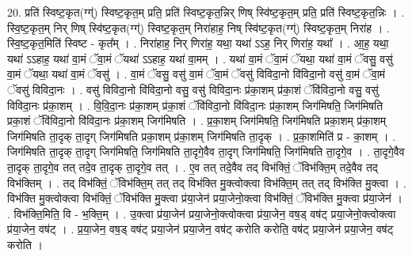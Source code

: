 \documentclass[17pt]{extarticle}
\begin{document}
20. प्रति॑ स्विष्ट॒कृत(ग्ग्॑) स्विष्ट॒कृत॒म् प्रति॒ प्रति॑ स्विष्ट॒कृत॒न्निर् णिष् स्वि॑ष्ट॒कृत॒म् प्रति॒ प्रति॑ स्विष्ट॒कृत॒न्निः । . स्वि॒ष्ट॒कृत॒म् निर् णिष् स्वि॑ष्ट॒कृत(ग्ग्॑) स्विष्ट॒कृत॒म् निरा॑हाह॒ निष् स्वि॑ष्ट॒कृत(ग्ग्॑) स्विष्ट॒कृत॒म् निरा॑ह । . स्वि॒ष्ट॒कृत॒मिति॑ स्विष्ट - कृत᳚म् । . निरा॑हाह॒ निर् णिरा॑ह॒ यथा॒ यथा॑ ऽऽह॒ निर् णिरा॑ह॒ यथा᳚ । . आ॒ह॒ यथा॒ यथा॑ ऽऽहाह॒ यथा॑ वा॒मं ॅवा॒मं ॅयथा॑ ऽऽहाह॒ यथा॑ वा॒मम् । . यथा॑ वा॒मं ॅवा॒मं ॅयथा॒ यथा॑ वा॒मं ॅवसु॒ वसु॑ वा॒मं ॅयथा॒ यथा॑ वा॒मं ॅवसु॑ । . वा॒मं ॅवसु॒ वसु॑ वा॒मं ॅवा॒मं ॅवसु॑ विविदा॒नो वि॑विदा॒नो वसु॑ वा॒मं ॅवा॒मं ॅवसु॑ विविदा॒नः । . वसु॑ विविदा॒नो वि॑विदा॒नो वसु॒ वसु॑ विविदा॒नः प्र॑का॒शम् प्र॑का॒शं ॅवि॑विदा॒नो वसु॒ वसु॑ विविदा॒नः प्र॑का॒शम् । . वि॒वि॒दा॒नः प्र॑का॒शम् प्र॑का॒शं ॅवि॑विदा॒नो वि॑विदा॒नः प्र॑का॒शम् जिग॑मिषति॒ जिग॑मिषति प्रका॒शं ॅवि॑विदा॒नो वि॑विदा॒नः प्र॑का॒शम् जिग॑मिषति । . प्र॒का॒शम् जिग॑मिषति॒ जिग॑मिषति प्रका॒शम् प्र॑का॒शम् जिग॑मिषति ता॒दृक् ता॒दृग् जिग॑मिषति प्रका॒शम् प्र॑का॒शम् जिग॑मिषति ता॒दृक् । . प्र॒का॒शमिति॑ प्र - का॒शम् । . जिग॑मिषति ता॒दृक् ता॒दृग् जिग॑मिषति॒ जिग॑मिषति ता॒दृगे॒वैव ता॒दृग् जिग॑मिषति॒ जिग॑मिषति ता॒दृगे॒व । . ता॒दृगे॒वैव ता॒दृक् ता॒दृगे॒व तत् तदे॒व ता॒दृक् ता॒दृगे॒व तत् । . ए॒व तत् तदे॒वैव तद् विभ॑क्तिं॒ ॅविभ॑क्ति॒म् तदे॒वैव तद् विभ॑क्तिम् । . तद् विभ॑क्तिं॒ ॅविभ॑क्ति॒म् तत् तद् विभ॑क्ति मु॒क्त्वोक्त्वा विभ॑क्ति॒म् तत् तद् विभ॑क्ति मु॒क्त्वा । . विभ॑क्ति मु॒क्त्वोक्त्वा विभ॑क्तिं॒ ॅविभ॑क्ति मु॒क्त्वा प्र॑या॒जेन॑ प्रया॒जेनो॒क्त्वा विभ॑क्तिं॒ ॅविभ॑क्ति मु॒क्त्वा प्र॑या॒जेन॑ । . विभ॑क्ति॒मिति॒ वि - भ॒क्ति॒म् । . उ॒क्त्वा प्र॑या॒जेन॑ प्रया॒जेनो॒क्त्वोक्त्वा प्र॑या॒जेन॒ वष॒ड् वष॑ट् प्रया॒जेनो॒क्त्वोक्त्वा प्र॑या॒जेन॒ वष॑ट् । . प्र॒या॒जेन॒ वष॒ड् वष॑ट् प्रया॒जेन॑ प्रया॒जेन॒ वष॑ट् करोति करोति॒ वष॑ट् प्रया॒जेन॑ प्रया॒जेन॒ वष॑ट् करोति । \newline
\end{document}
